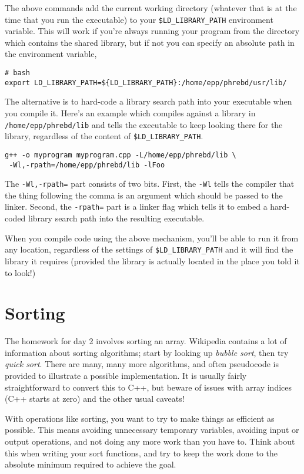 \documentclass[a4paper]{scrartcl}
\begin{document}
The above commands add the current working directory (whatever that is at the time that you run the executable) to your \verb|$LD_LIBRARY_PATH| environment variable. This will work if you're always running your program from the directory which contains the shared library, but if not you can specify an absolute path in the environment variable,
\begin{verbatim}
# bash
export LD_LIBRARY_PATH=${LD_LIBRARY_PATH}:/home/epp/phrebd/usr/lib/
\end{verbatim}

The alternative is to hard-code a library search path into your executable when you compile it. Here's an example which compiles against a library in \verb|/home/epp/phrebd/lib| and tells the executable to keep looking there for the library, regardless of the content of \verb|$LD_LIBRARY_PATH|.
\begin{verbatim}
g++ -o myprogram myprogram.cpp -L/home/epp/phrebd/lib \
 -Wl,-rpath=/home/epp/phrebd/lib -lFoo
\end{verbatim}

The \verb|-Wl,-rpath=| part consists of two bits. First, the \verb|-Wl| tells the compiler that the thing following the comma is an argument which should be passed to the linker. Second, the \verb|-rpath=| part is a linker flag which tells it to embed a hard-coded library search path into the resulting executable.

When you compile code using the above mechanism, you'll be able to run it from any location, regardless of the settings of \verb|$LD_LIBRARY_PATH| and it will find the library it requires (provided the library is actually located in the place you told it to look!)

\section{Sorting}
The homework for day 2 involves sorting an array. Wikipedia contains a lot of information about sorting algorithms; start by looking up \emph{bubble sort}, then try \emph{quick sort}. There are many, many more algorithms, and often pseudocode is provided to illustrate a possible implementation. It is usually fairly straightforward to convert this to C++, but beware of issues with array indices (C++ starts at zero) and the other usual caveats!

With operations like sorting, you want to try to make things as efficient as possible. This means avoiding unnecessary temporary variables, avoiding input or output operations, and not doing any more work than you have to. Think about this when writing your sort functions, and try to keep the work done to the absolute minimum required to achieve the goal.
\end{document}
